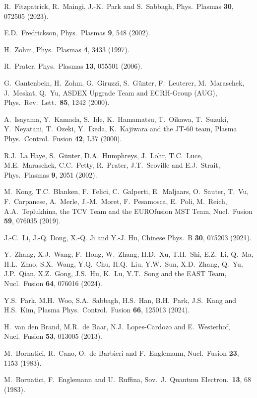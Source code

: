 \documentclass{iopjournal}
\begin{document}
{\begin{thebibliography}{99}
  R.~Fitzpatrick, R.~Maingi, J.-K.~Park and S.~Sabbagh, Phys.\ Plasmas {\bf 30}, 072505 (2023).

 E.D.~Fredrickson, Phys.\ Plasmas {\bf 9}, 548 (2002).

 H.~Zohm, Phys.\ Plasmas {\bf 4}, 3433 (1997). 

 R.~Prater, Phys.\ Plasmas {\bf 13}, 055501 (2006).

 G.~Gantenbein, H.~Zohm, G.~Giruzzi, S.~G\"{u}nter, F.~Leuterer, M.~Maraschek, J.~Meskat, Q.~Yu,  ASDEX Upgrade Team and ECRH-Group (AUG), 
Phys.\ Rev.\ Lett.\ {\bf 85}, 1242 (2000). 

 A.~Isayama, Y.~Kamada, S.~Ide, K.~Hamamatsu, T.~Oikawa, T.~Suzuki, Y.~Neyatani, T.~Ozeki, Y.~Ikeda, K.~Kajiwara and the JT-60 team,  
Plasma Phys.\  Control.\ Fusion {\bf 42}, L37 (2000).

 R.J.~La Haye,  S.~G\"{u}nter,  D.A.~Humphreys,  J.~Lohr,  T.C.~Luce,  M.E.~Maraschek,  C.C.~Petty, R.~Prater,  J.T.~Scoville and E.J.~Strait,
 Phys.\ Plasmas {\bf 9}, 2051 (2002).
 
  M.~Kong, T.C.~Blanken, F.~Felici, C.~Galperti, E.~Maljaars,
O.~Sauter, T.~Vu, F.~Carpanese, A.~Merle, J.-M.~Moret, F.~Pesamosca, E.~Poli, M.~Reich, A.A.~Teplukhina, the TCV Team and the EUROfusion MST Team,
Nucl.\ Fusion {\bf 59}, 076035 (2019).

 J.-C.~Li, J.-Q. Dong, X.-Q. Ji and Y.-J. Hu,  Chinese Phys.\ B {\bf 30}, 075203 (2021).

 Y.~Zhang, X.J.~Wang, F.~Hong, W.~Zhang, H.D.~Xu, T.H.~Shi, E.Z.~Li, Q.~Ma, H.L.~Zhao, S.X.~Wang, Y.Q.~Chu, H.Q.~Liu, Y.W.~Sun, 
X.D.~Zhang, Q.~Yu, J.P.~Qian, X.Z.~Gong, J.S.~Hu, K.~Lu, Y.T.~Song and the EAST Team, 
 Nucl.\ Fusion {\bf 64},  076016 (2024).

 Y.S.~Park, M.H.~Woo, S.A.~Sabbagh, H.S.~Han, B.H.~Park, J.S.~Kang and H.S.~Kim,  Plasma Phys.\ Control.\ Fusion {\bf 66}, 125013 (2024).

 H.~van den Brand, M.R.~de Baar, N.J.~Lopes-Cardozo and E.~Westerhof, Nucl.\ Fusion {\bf 53}, 013005 (2013). 
  
 M.~Bornatici, R.~Cano, O.~de Barbieri and F.~Englemann, Nucl.\ Fusion {\bf 23}, 1153 (1983). 

 M.~Bornatici, F.~Englemann and U.~Ruffina, Sov.\ J.\ Quantum Electron.\ {\bf 13}, 68 (1983).


\end{thebibliography}}
\end{document}
